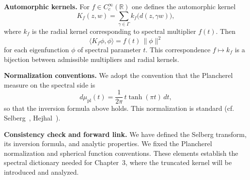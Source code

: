 \medskip
\noindent\textbf{Automorphic kernels.}
For $f\in C_{c}^{\infty}(\mathbb{R})$ one defines the automorphic kernel
\[
  K_{f}(z,w) = \sum_{\gamma\in\Gamma} k_{f}\!\big(d(z,\gamma w)\big),
\]
where $k_{f}$ is the radial kernel corresponding to spectral multiplier $f(t)$.
Then
\[
  \langle K_{f}\phi,\phi\rangle = f(t)\,\|\phi\|^{2}
\]
for each eigenfunction $\phi$ of spectral parameter $t$.
This correspondence $f \mapsto k_{f}$ is a bijection between admissible multipliers
and radial kernels.

\medskip
\noindent\textbf{Normalization conventions.}
We adopt the convention that the Plancherel measure on the spectral side is
\[
  d\mu_{\mathrm{pl}}(t) = \frac{1}{2\pi}\,t\tanh(\pi t)\,dt,
\]
so that the inversion formula above holds.
This normalization is standard (cf. Selberg~\cite{Selberg1956}, Hejhal~\cite{Hejhal1983}).

\medskip
\noindent\textbf{Consistency check and forward link.}
We have defined the Selberg transform, its inversion formula, and analytic properties.
We fixed the Plancherel normalization and spherical function conventions.
These elements establish the spectral dictionary needed for Chapter~3,
where the truncated kernel will be introduced and analyzed.
